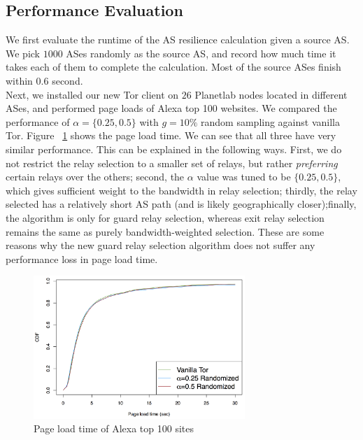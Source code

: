 \subsection{Performance Evaluation}

We first evaluate the runtime of the AS resilience calculation given a source AS. We pick $1000$ ASes randomly as the source AS, and record how much time it takes each of them to complete the calculation. Most of the source ASes finish within $0.6$ second. \\


Next, we installed our new Tor client on $26$ Planetlab nodes located in different ASes, and performed page loads of Alexa top 100 websites. We compared the performance of $\alpha=\{0.25,0.5\}$ with $g=10\%$ random sampling against vanilla Tor. Figure ~\ref{fig_pageload} shows the page load time. We can see that all three have very similar performance. This can be explained in the following ways. First, we do not restrict the relay selection to a smaller set of relays, but rather \emph{preferring} certain relays over the others; second, the $\alpha$ value was tuned to be $\{0.25,0.5\}$, which gives sufficient weight to the bandwidth in relay selection; thirdly, the relay selected has a relatively short AS path (and is likely geographically closer);finally, the algorithm is only for guard relay selection, whereas exit relay selection remains the same as purely bandwidth-weighted selection. These are some reasons why the new guard relay selection algorithm does not suffer any performance loss in page load time. 

\begin{figure}[ht!]
\centering
\includegraphics[width=80mm]{figure/pageloadtime}
\caption{Page load time of Alexa top 100 sites \label{fig_pageload}}
\end{figure}



